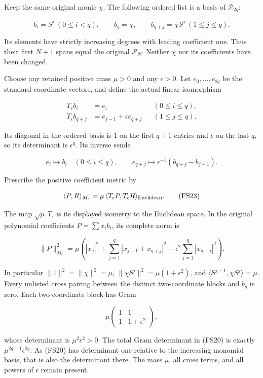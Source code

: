 Keep the same original monic \(\chi\). The following ordered list is a basis of \(\mathcal P_{2q}\):

\[
b_i=S^i\ (0\le i<q),\qquad
b_q=\chi,\qquad
b_{q+j}=\chi S^j\ (1\le j\le q).
\tag{FS20}
\]

Its elements have strictly increasing degrees with leading coefficient one. Thus their first \(N+1\) spans equal the original \(\mathcal P_N\). Neither \(\chi\) nor its coefficients have been changed.

Choose any retained positive mass \(\mu>0\) and any \(\epsilon>0\). Let \(e_0,\ldots,e_{2q}\) be the standard coordinate vectors, and define the actual linear isomorphism

\[
\begin{aligned}
T_\epsilon b_i&=e_i &&(0\le i\le q),\\
T_\epsilon b_{q+j}&=e_{j-1}+\epsilon e_{q+j}
&&(1\le j\le q).
\end{aligned}
\tag{FS21}
\]

Its diagonal in the ordered basis is \(1\) on the first \(q+1\) entries and \(\epsilon\) on the last \(q\), so its determinant is \(\epsilon^q\). Its inverse sends

\[
e_i\longmapsto b_i\quad(0\le i\le q),\qquad
e_{q+j}\longmapsto\epsilon^{-1}(b_{q+j}-b_{j-1}).
\tag{FS22}
\]

Prescribe the positive coefficient metric by

\[
\langle P,R\rangle_{M_\epsilon}
=\mu\,\langle T_\epsilon P,T_\epsilon R\rangle_{\rm Euclidean}.
\tag{FS23}
\]

The map \(\sqrt\mu\,T_\epsilon\) is its displayed isometry to the Euclidean space. In the original polynomial coefficients \(P=\sum x_i b_i\), its complete norm is

\[
\boxed{
\|P\|_{M_\epsilon}^2
=\mu\left(|x_q|^2+
\sum_{j=1}^q|x_{j-1}+x_{q+j}|^2+
\epsilon^2\sum_{j=1}^q|x_{q+j}|^2\right).
}
\tag{FS24}
\]

In particular \(\|1\|^2=\|\chi\|^2=\mu\), \(\|\chi S^j\|^2=\mu(1+\epsilon^2)\), and \(\langle S^{j-1},\chi S^j\rangle=\mu\). Every unlisted cross pairing between the distinct two-coordinate blocks and \(b_q\) is zero. Each two-coordinate block has Gram

\[
\mu\begin{pmatrix}1&1\\1&1+\epsilon^2\end{pmatrix},
\tag{FS25}
\]

whose determinant is \(\mu^2\epsilon^2>0\). The total Gram determinant in (FS20) is exactly \(\mu^{2q+1}\epsilon^{2q}\). As (FS20) has determinant one relative to the increasing monomial basis, that is also the determinant there. The mass \(\mu\), all cross terms, and all powers of \(\epsilon\) remain present.

